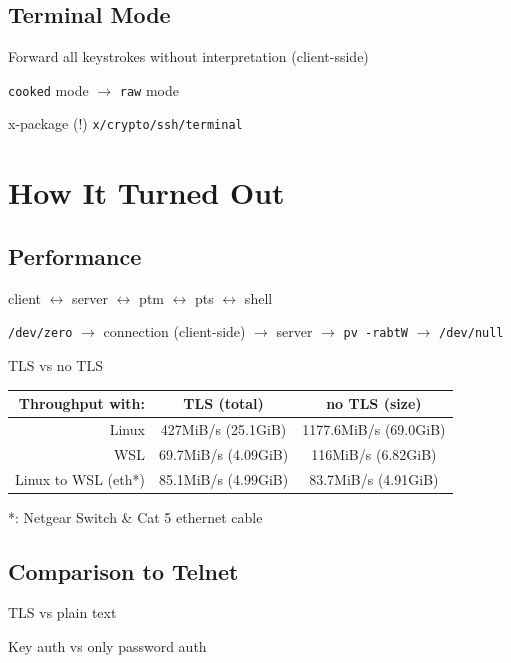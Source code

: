 \documentclass[
	xcolor=dvipsnames,
	handout
]{beamer}
\newenvironment{zhawframe}[1][]
{\begin{frame}[environment=fr,#1]{\insertsubsectionhead}{\insertsectionhead}}
{\end{frame}
}
\begin{document}
\subsection{Terminal Mode}
\begin{zhawframe}
 Forward all keystrokes without interpretation (client-sside)

 \texttt{cooked} mode $\rightarrow$ \texttt{raw} mode

 x-package (!) \texttt{x/crypto/ssh/terminal}
\end{zhawframe}

\section{How It Turned Out}
\subsection{Performance}
\begin{zhawframe}
 client \textcolor{green!60!blue}{$\leftrightarrow$} server $\leftrightarrow$ ptm $\leftrightarrow$ pts $\leftrightarrow$ shell

 \texttt{/dev/zero} $\rightarrow$ connection (client-side) $\rightarrow$ server $\rightarrow$ \texttt{pv -rabtW} $\rightarrow$ \texttt{/dev/null}

 TLS vs no TLS

\begin{table}[ht]
\centering
\begin{tabular}{rcc}
Throughput with:		& TLS (total)	& no TLS (size)\\\hline
Linux 					& 427MiB/s (25.1GiB)	& 1177.6MiB/s (69.0GiB)\\
WSL 					& 69.7MiB/s (4.09GiB)	& 116MiB/s (6.82GiB)\\
Linux to WSL (eth*) 	& 85.1MiB/s (4.99GiB)	& 83.7MiB/s (4.91GiB)
\end{tabular}
\end{table}
 *: Netgear Switch \& Cat 5 ethernet cable
\end{zhawframe}

\subsection{Comparison to Telnet}
\begin{zhawframe}
 TLS vs plain text

 Key auth vs only password auth
\end{zhawframe}
\end{document}
